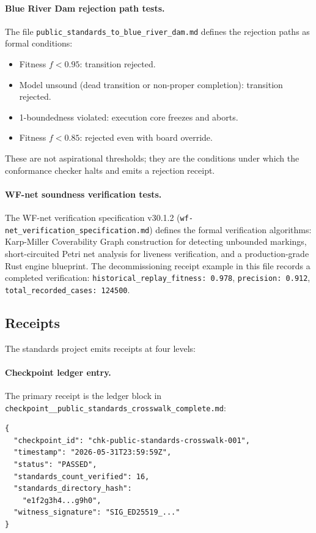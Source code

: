 \paragraph{Blue River Dam rejection path tests.}
The file \texttt{public\_standards\_to\_blue\_river\_dam.md} defines the rejection paths
as formal conditions:
\begin{itemize}
  \item Fitness $f < 0.95$: transition rejected.
  \item Model unsound (dead transition or non-proper completion): transition rejected.
  \item 1-boundedness violated: execution core freezes and aborts.
  \item Fitness $f < 0.85$: rejected even with board override.
\end{itemize}
These are not aspirational thresholds; they are the conditions under which the
conformance checker halts and emits a rejection receipt.

\paragraph{WF-net soundness verification tests.}
The WF-net verification specification v30.1.2 (\texttt{wf-net\_verification\_specification.md})
defines the formal verification algorithms: Karp-Miller Coverability Graph construction
for detecting unbounded markings, short-circuited Petri net analysis for liveness
verification, and a production-grade Rust engine blueprint. The decommissioning receipt
example in this file records a completed verification:
\texttt{historical\_replay\_fitness: 0.978}, \texttt{precision: 0.912},
\texttt{total\_recorded\_cases: 124500}.

\subsection{Receipts}
\label{sec:standards-evidence-receipts}

The standards project emits receipts at four levels:

\paragraph{Checkpoint ledger entry.}
The primary receipt is the ledger block in \texttt{checkpoint\_\_public\_standards\_crosswalk\_complete.md}:
\begin{verbatim}
{
  "checkpoint_id": "chk-public-standards-crosswalk-001",
  "timestamp": "2026-05-31T23:59:59Z",
  "status": "PASSED",
  "standards_count_verified": 16,
  "standards_directory_hash":
    "e1f2g3h4...g9h0",
  "witness_signature": "SIG_ED25519_..."
}
\end{verbatim}

